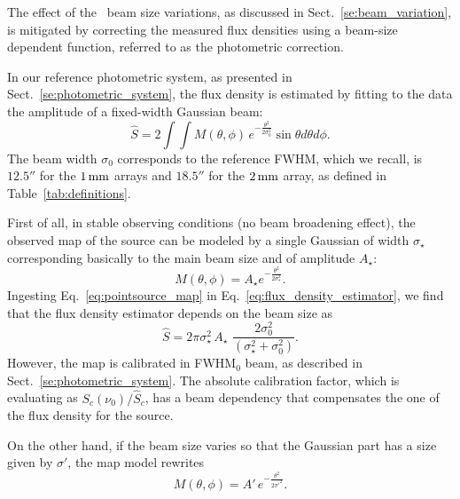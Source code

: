 %

The effect of the \afternoon\ beam size variations, as discussed
in Sect.~\ref{se:beam_variation}, is mitigated by correcting the measured flux
densities using a beam-size dependent function, referred to as the
photometric correction.

In our reference photometric system, as presented in
Sect.~\ref{se:photometric_system}, 
the flux density is estimated by fitting to the data the amplitude of a fixed-width
Gaussian beam:
\begin{equation}
  \hat{S}  = 2 \int \int M(\theta, \phi)\, e^{-\frac{\theta^{2}}{2\sigma_{0}^{2}}} \sin \theta d\theta d\phi.
  \label{eq:flux_density_estimator}
\end{equation}
The beam width $\sigma_{0}$ corresponds to the
reference FWHM, which we recall, is $12.5''$ for the $1\,\rm{mm}$ arrays and $18.5''$ for
the $2\,\rm{mm}$ array, as defined in Table~\ref{tab:definitions}.

First of all, in stable observing conditions (no beam
broadening effect), the observed map of the source can be modeled by a single Gaussian of
width $\sigma_\star$ corresponding basically to the main beam size and
of amplitude $A_\star$:
\begin{equation}
  M(\theta, \phi) = A_\star e^{-\frac{\theta^{2}}{2\sigma_\star^{2}}}.
  \label{eq:pointsource_map}
\end{equation}
Ingesting Eq.~\ref{eq:pointsource_map} in
Eq.~\ref{eq:flux_density_estimator}, we find that the flux density
estimator depends on the beam size as
\begin{equation}
  \hat{S}  = 2\pi \sigma_{\star}^2 \, A_{\star} \, \,  \frac{2 \sigma_0^2}{(\sigma_{\star}^2 + \sigma_0^2)}.
\end{equation}
However, the map is calibrated in FWHM$_0$ beam, as described in
Sect.~\ref{se:photometric_system}. The absolute calibration factor,
which is evaluating as
$S_{c}(\nu_{0})/\hat{S}_{c}$, has a beam dependency that
compensates the one of the flux density for the source.

On the other hand, if the beam size varies so that the Gaussian part has a size given by
$\sigma'$, the map model rewrites  
\begin{equation}
  M(\theta, \phi) = A'\, e^{-\frac{\theta^{2}}{2\sigma'^{2}}}.
  \label{eq:broader_beam_map}
\end{equation}

